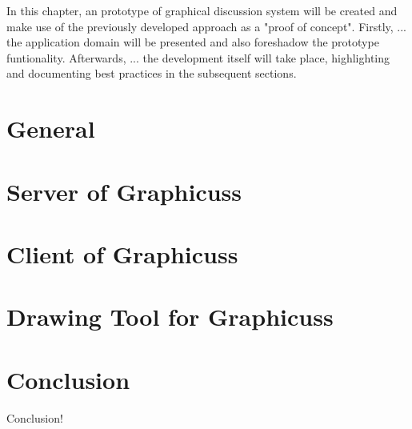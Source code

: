 In this chapter, an prototype of graphical discussion system will be created and make use of the previously developed approach as a "proof of concept". Firstly, ... the application domain will be presented and also foreshadow the prototype funtionality. Afterwards, ... the development itself will take place, highlighting and documenting best practices in the subsequent sections.


\section{General}


\section{Server of Graphicuss}


\section{Client of Graphicuss}


\section{Drawing Tool for Graphicuss}


% 

\section{Conclusion}
Conclusion!
